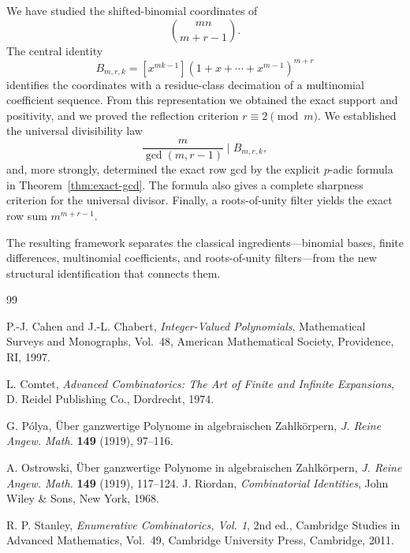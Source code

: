 \documentclass[11pt]{article}
\theoremstyle{definition}
\theoremstyle{remark}
\begin{document}
We have studied the shifted-binomial coordinates of
\[
 \binom{mn}{m+r-1}.
\]
The central identity
\[
 B_{m,r,k}
 =
 [x^{mk-1}](1+x+\cdots+x^{m-1})^{m+r}
\]
identifies the coordinates with a residue-class decimation of a multinomial
coefficient sequence. From this representation we obtained the exact
support and positivity, and we proved the reflection criterion
$r\equiv2\pmod m$. We established the universal divisibility law
\[
 \frac{m}{\gcd(m,r-1)}\mid B_{m,r,k},
\]
and, more strongly, determined the exact row gcd by the explicit
$p$-adic formula in Theorem~\ref{thm:exact-gcd}. The formula also gives a
complete sharpness criterion for the universal divisor. Finally, a
roots-of-unity filter yields the exact row sum $m^{m+r-1}$.

The resulting framework separates the classical ingredients---binomial
bases, finite differences, multinomial coefficients, and roots-of-unity
filters---from the new structural identification that connects them.

\begin{thebibliography}{99}

P.-J. Cahen and J.-L. Chabert,
\emph{Integer-Valued Polynomials},
Mathematical Surveys and Monographs, Vol.~48,
American Mathematical Society, Providence, RI, 1997.

L. Comtet,
\emph{Advanced Combinatorics: The Art of Finite and Infinite Expansions},
D. Reidel Publishing Co., Dordrecht, 1974.

G. P\'olya,
\"Uber ganzwertige Polynome in algebraischen Zahlk\"orpern,
\emph{J. Reine Angew. Math.} \textbf{149} (1919), 97--116.

A. Ostrowski,
\"Uber ganzwertige Polynome in algebraischen Zahlk\"orpern,
\emph{J. Reine Angew. Math.} \textbf{149} (1919), 117--124.
J. Riordan,
\emph{Combinatorial Identities},
John Wiley \& Sons, New York, 1968.

R. P. Stanley,
\emph{Enumerative Combinatorics, Vol. 1},
2nd ed., Cambridge Studies in Advanced Mathematics, Vol.~49,
Cambridge University Press, Cambridge, 2011.

\end{thebibliography}
\end{document}

